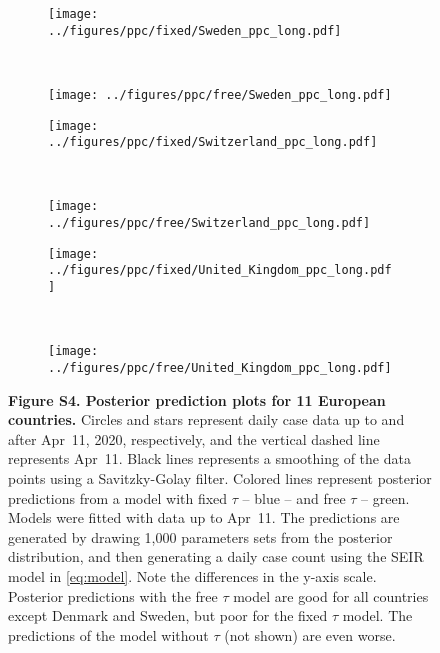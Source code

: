\documentclass[12pt]{extarticle}
\begin{document}
\begin{figure}
    \ContinuedFloat 
    \begin{subfigure}{0.45\textwidth}
        \texttt{[image: ../figures/ppc/fixed/Sweden\_ppc\_long.pdf]}
    \end{subfigure}
    ~
    \begin{subfigure}{0.45\textwidth}
        \texttt{[image: ../figures/ppc/free/Sweden\_ppc\_long.pdf]}
    \end{subfigure}
    \begin{subfigure}{0.45\textwidth}
        \texttt{[image: ../figures/ppc/fixed/Switzerland\_ppc\_long.pdf]}
    \end{subfigure}
    ~
    \begin{subfigure}{0.45\textwidth}
        \texttt{[image: ../figures/ppc/free/Switzerland\_ppc\_long.pdf]}
    \end{subfigure}
    \begin{subfigure}{0.45\textwidth}
        \texttt{[image: ../figures/ppc/fixed/United\_Kingdom\_ppc\_long.pdf]}
    \end{subfigure}
    ~
    \begin{subfigure}{0.45\textwidth}
        \texttt{[image: ../figures/ppc/free/United\_Kingdom\_ppc\_long.pdf]}
    \end{subfigure}
    \caption{
    \textbf{Figure S4. Posterior prediction plots for 11 European countries.}
    Circles and stars represent daily case data up to and after Apr~11, 2020, respectively, and the vertical dashed line represents Apr~11.
    Black lines represents a smoothing of the data points using a Savitzky-Golay filter. 
    Colored lines represent posterior predictions from a model with fixed $\tau$ -- blue -- and free $\tau$ -- green. Models were fitted with data up to Apr~11. The predictions are generated by drawing 1,000 parameters sets from the posterior distribution, and then generating a daily case count using the SEIR model in \autoref{eq:model}. Note the differences in the y-axis scale.
    Posterior predictions with the free $\tau$ model are good for all countries except Denmark and Sweden, but poor for the fixed $\tau$ model.
    The predictions of the model without $\tau$ (not shown) are even worse.
    }	
\end{figure}
\end{document}
